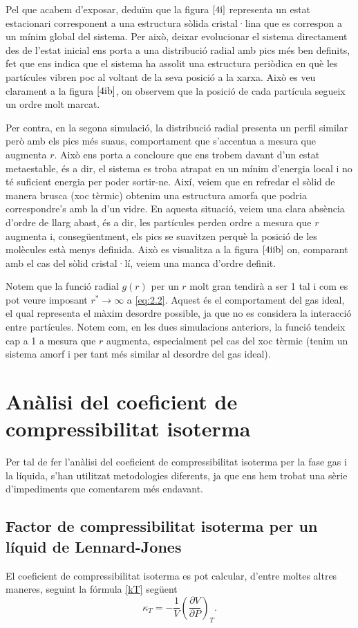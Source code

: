 \documentclass[a4paper,10.5pt]{report}
\begin{document}
Pel que acabem d'exposar, deduïm que la figura $\ref{4i}$ representa un estat estacionari corresponent a una estructura sòlida cristal·lina que es correspon a un mínim global del sistema. Per això, deixar evolucionar el sistema directament des de l'estat inicial ens porta a una distribució radial amb pics més ben definits, fet que ens indica que el sistema ha assolit una estructura periòdica en què les partícules vibren poc al voltant de la seva posició a la xarxa. Això es veu clarament a la figura $\ref{4ib}$, on observem que la posició de cada partícula segueix un ordre molt marcat.

Per contra, en la segona simulació, la distribució radial presenta un perfil similar però amb els pics més suaus, comportament que s'accentua a mesura que augmenta $r$. Això ens porta a concloure que ens trobem davant d'un estat metaestable, és a dir, el sistema es troba atrapat en un mínim d'energia local i no té suficient energia per poder sortir-ne. Així, veiem que en refredar el sòlid de manera brusca (xoc tèrmic) obtenim una estructura amorfa que podria correspondre's amb la d'un vidre. En aquesta situació, veiem una clara absència d'ordre de llarg abast, és a dir, les partícules perden ordre a mesura que $r$ augmenta i, consegüentment, els pics se suavitzen perquè la posició de les molècules està menys definida. Això es visualitza a la figura $\ref{4iib}$ on, comparant amb el cas del sòlid cristal·lí, veiem una manca d'ordre definit.

Notem que la funció radial $g(r)$ per un $r$ molt gran tendirà a ser 1 tal i com es pot veure imposant $r^* \rightarrow \infty$ a \eqref{eq:2.2}. Aquest és el comportament del gas ideal, el qual representa el màxim desordre possible, ja que no es considera la interacció entre partícules. Notem com, en les dues simulacions anteriors, la funció tendeix cap a 1 a mesura que $r$ augmenta, especialment pel cas del xoc tèrmic (tenim un sistema amorf i per tant més similar al desordre del gas ideal). 

\section{Anàlisi del coeficient de compressibilitat isoterma}
Per tal de fer l'anàlisi del coeficient de compressibilitat isoterma per la fase gas i la líquida, s'han utilitzat metodologies diferents, ja que ens hem trobat una sèrie d'impediments que comentarem més endavant.

\subsection{Factor de compressibilitat isoterma per un líquid de Lennard-Jones}
El coeficient de compressibilitat isoterma es pot calcular, d'entre moltes altres maneres, seguint la fórmula \eqref{kT} següent
\begin{equation}
	\kappa_T=-\frac{1}{V}\left(\frac{\partial V}{\partial P}\right)_T.
	\label{kT}
\end{equation}
\end{document}
